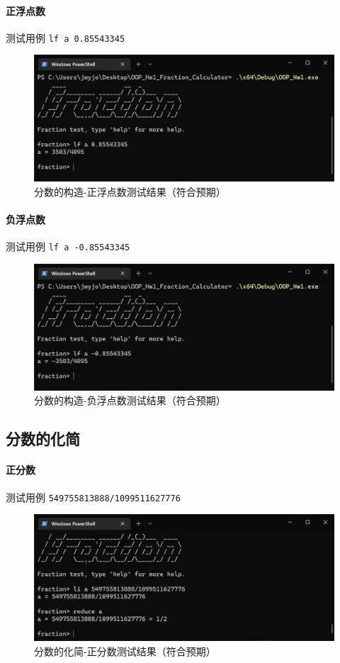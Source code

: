 \documentclass[cn,black,12pt,normal]{elegantnote}
\begin{document}
\paragraph{正浮点数} 测试用例 \lstinline{lf a 0.85543345}
\begin{figure}[H]
    \centering
    \includegraphics[width=.8\textwidth]{imgs/test_construct_positive_float.jpg}
    \caption{分数的构造-正浮点数测试结果（符合预期）}
\end{figure}

\paragraph{负浮点数} 测试用例 \lstinline{lf a -0.85543345}
\begin{figure}[H]
    \centering
    \includegraphics[width=.8\textwidth]{imgs/test_construct_negative_float.jpg}
    \caption{分数的构造-负浮点数测试结果（符合预期）}
\end{figure}

\subsection{分数的化简}

\paragraph{正分数} 测试用例 \lstinline{549755813888/1099511627776}
\begin{figure}[H]
    \centering
    \includegraphics[width=.8\textwidth]{imgs/test_reduce_positive_frac.jpg}
    \caption{分数的化简-正分数测试结果（符合预期）}
\end{figure}
\end{document}
